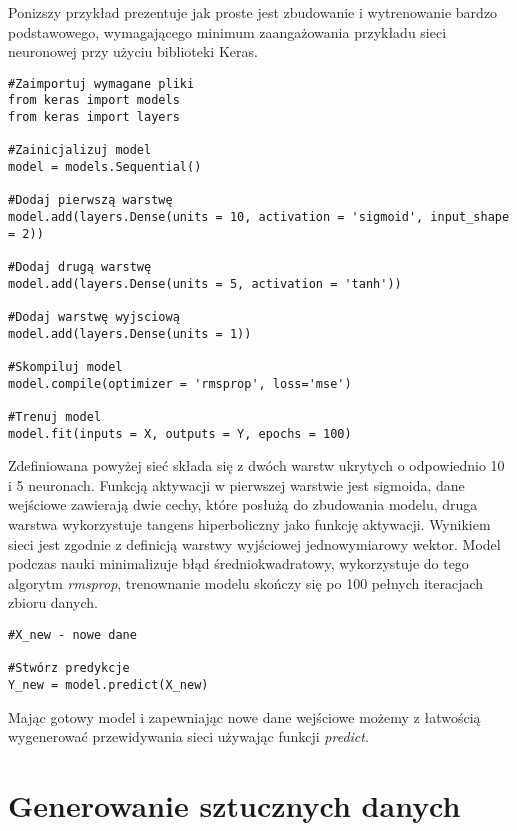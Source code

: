 \documentclass[11pt]{book}
\theoremstyle{definition}
\begin{document}
Ponizszy przykład prezentuje jak proste jest zbudowanie i wytrenowanie bardzo podstawowego, wymagającego minimum zaangażowania przykładu sieci neuronowej przy użyciu biblioteki Keras.


%
\begin{lstlisting}
#Zaimportuj wymagane pliki
from keras import models
from keras import layers

#Zainicjalizuj model
model = models.Sequential()

#Dodaj pierwszą warstwę
model.add(layers.Dense(units = 10, activation = 'sigmoid', input_shape = 2))

#Dodaj drugą warstwę
model.add(layers.Dense(units = 5, activation = 'tanh'))

#Dodaj warstwę wyjsciową
model.add(layers.Dense(units = 1))

#Skompiluj model
model.compile(optimizer = 'rmsprop', loss='mse')

#Trenuj model
model.fit(inputs = X, outputs = Y, epochs = 100)
\end{lstlisting}

Zdefiniowana powyżej sieć składa się z dwóch warstw ukrytych o odpowiednio 10 i 5 neuronach. Funkcją aktywacji w pierwszej warstwie jest sigmoida, dane wejściowe zawierają dwie cechy, które posłużą do zbudowania modelu, druga warstwa wykorzystuje tangens hiperboliczny jako funkcję aktywacji. Wynikiem sieci jest zgodnie z definicją warstwy wyjściowej jednowymiarowy wektor. Model podczas nauki minimalizuje błąd średniokwadratowy, wykorzystuje do tego algorytm \textit{rmsprop}, trenownanie modelu skończy się po 100 pełnych iteracjach zbioru danych.

\begin{lstlisting}
#X_new - nowe dane 

#Stwórz predykcje
Y_new = model.predict(X_new)
\end{lstlisting}

Mając gotowy model i zapewniając nowe dane wejściowe możemy z łatwością wygenerować przewidywania sieci używając funkcji \textit{predict}.

\section{Generowanie sztucznych danych}

\end{document}
